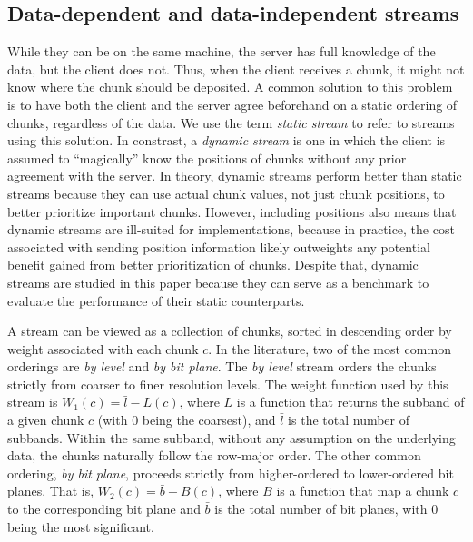 \subsection{Data-dependent and data-independent streams}
\label{sec:static-dynamic-streams}

While they can be on the same machine, the server has full knowledge of the data, but the client
does not. Thus, when the client receives a chunk, it might not know where the chunk should be
deposited. A common solution to this problem is to have both the client and the server agree
beforehand on a static ordering of chunks, regardless of the data. We use the term
\emph{static stream} to refer to streams using this solution. In constrast, a \emph{dynamic stream}
is one in which the client is assumed to ``magically'' know the positions of chunks without any
prior agreement with the server. In theory, dynamic streams perform better than static streams
because they can use actual chunk values, not just chunk positions, to better prioritize important
chunks. However, including positions also means that dynamic streams are ill-suited for
implementations, because in practice, the cost associated with sending position information likely
outweights any potential benefit gained from better prioritization of chunks. Despite that, dynamic
streams are studied in this paper because they can serve as a benchmark to evaluate the performance
of their static counterparts.

A stream can be viewed as a collection of chunks, sorted in descending order by weight
associated with each chunk $c$. In the literature, two of the most common orderings are \emph{by
level} and \emph{by bit plane}. The \emph{by level} stream orders the chunks strictly from coarser
to finer resolution levels. The weight function used by this stream is $W_1(c)=\bar{l}-L(c)$, where
$L$ is a function that returns the subband of a given chunk $c$ (with $0$ being the coarsest), and
$\bar{l}$ is the total number of subbands. Within the same subband, without any assumption on the
underlying data, the chunks naturally follow the row-major order. The other common ordering,
\emph{by bit plane}, proceeds strictly from higher-ordered to lower-ordered bit planes. That is,
$W_2(c)=\bar{b}-B(c)$, where $B$ is a function that map a chunk $c$ to the corresponding bit plane
and $\bar{b}$ is the total number of bit planes, with $0$ being the most significant.

